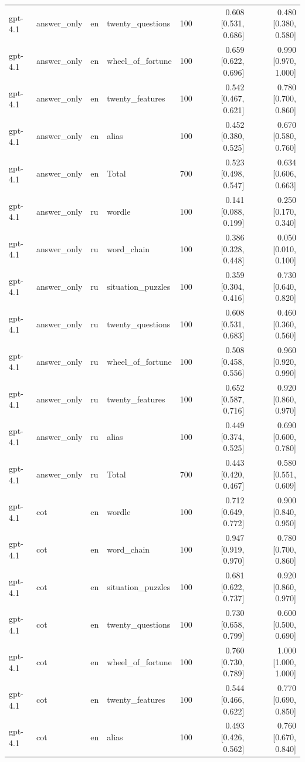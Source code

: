 \begin{longtable}{llllrrr}
gpt-4.1 & answer\_only & en & twenty\_questions & 100 & 0.608 [0.531, 0.686] & 0.480 [0.380, 0.580] \\
gpt-4.1 & answer\_only & en & wheel\_of\_fortune & 100 & 0.659 [0.622, 0.696] & 0.990 [0.970, 1.000] \\
gpt-4.1 & answer\_only & en & twenty\_features & 100 & 0.542 [0.467, 0.621] & 0.780 [0.700, 0.860] \\
gpt-4.1 & answer\_only & en & alias & 100 & 0.452 [0.380, 0.525] & 0.670 [0.580, 0.760] \\
gpt-4.1 & answer\_only & en & Total & 700 & 0.523 [0.498, 0.547] & 0.634 [0.606, 0.663] \\
gpt-4.1 & answer\_only & ru & wordle & 100 & 0.141 [0.088, 0.199] & 0.250 [0.170, 0.340] \\
gpt-4.1 & answer\_only & ru & word\_chain & 100 & 0.386 [0.328, 0.448] & 0.050 [0.010, 0.100] \\
gpt-4.1 & answer\_only & ru & situation\_puzzles & 100 & 0.359 [0.304, 0.416] & 0.730 [0.640, 0.820] \\
gpt-4.1 & answer\_only & ru & twenty\_questions & 100 & 0.608 [0.531, 0.683] & 0.460 [0.360, 0.560] \\
gpt-4.1 & answer\_only & ru & wheel\_of\_fortune & 100 & 0.508 [0.458, 0.556] & 0.960 [0.920, 0.990] \\
gpt-4.1 & answer\_only & ru & twenty\_features & 100 & 0.652 [0.587, 0.716] & 0.920 [0.860, 0.970] \\
gpt-4.1 & answer\_only & ru & alias & 100 & 0.449 [0.374, 0.525] & 0.690 [0.600, 0.780] \\
gpt-4.1 & answer\_only & ru & Total & 700 & 0.443 [0.420, 0.467] & 0.580 [0.551, 0.609] \\
gpt-4.1 & cot & en & wordle & 100 & 0.712 [0.649, 0.772] & 0.900 [0.840, 0.950] \\
gpt-4.1 & cot & en & word\_chain & 100 & 0.947 [0.919, 0.970] & 0.780 [0.700, 0.860] \\
gpt-4.1 & cot & en & situation\_puzzles & 100 & 0.681 [0.622, 0.737] & 0.920 [0.860, 0.970] \\
gpt-4.1 & cot & en & twenty\_questions & 100 & 0.730 [0.658, 0.799] & 0.600 [0.500, 0.690] \\
gpt-4.1 & cot & en & wheel\_of\_fortune & 100 & 0.760 [0.730, 0.789] & 1.000 [1.000, 1.000] \\
gpt-4.1 & cot & en & twenty\_features & 100 & 0.544 [0.466, 0.622] & 0.770 [0.690, 0.850] \\
gpt-4.1 & cot & en & alias & 100 & 0.493 [0.426, 0.562] & 0.760 [0.670, 0.840] \\

\end{longtable}
